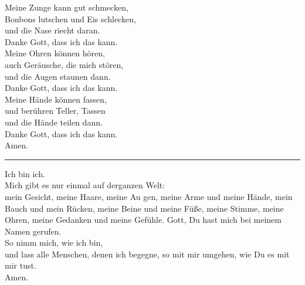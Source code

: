 Meine Zunge kann gut schmecken,\\
Bonbons lutschen und Eis schlecken, \\
und die Nase riecht daran.\\
Danke Gott, dass ich das kann.\\ \newline
Meine Ohren können hören,\\
 auch Geräusche, die mich stören,\\
 und die Augen staunen dann.\\
 Danke Gott, dass ich das kann.\\ \newline
Meine Hände können fassen,\\
und berühren Teller, Tassen\\
und die Hände teilen dann.\\
Danke Gott, dass ich das kann.\\ \newline
Amen.\\
\par\noindent\rule{\textwidth}{0.4pt} \newline \newline
Ich bin ich.\\
Mich gibt es nur einmal auf derganzen Welt:\\
mein Gesicht, meine Haare, meine Au gen, meine Arme und meine Hände, mein\\
Bauch und mein Rücken,  meine Beine und meine Füße,  meine Stimme, meine\\
Ohren,  meine Gedanken und meine Gefühle.  Gott, Du hast mich bei meinem\\
Namen gerufen.\\
So nimm mich, wie ich bin, \\
und lass alle Menschen, denen ich begegne, so mit mir umgehen, wie Du es mit\\
mir tust. \\ \newline
Amen.\\
\newpage